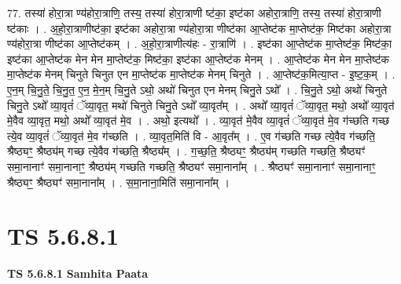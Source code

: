 \documentclass[17pt]{extarticle}
\begin{document}
77. तस्या॑ होरा॒त्रा ण्य॑होरा॒त्राणि॒ तस्य॒ तस्या॑ होरा॒त्राणी ष्ट॑का॒ इष्ट॑का अहोरा॒त्राणि॒ तस्य॒ तस्या॑ होरा॒त्राणी ष्ट॑काः । . अ॒हो॒रा॒त्राणीष्ट॑का॒ इष्ट॑का अहोरा॒त्रा ण्य॑होरा॒त्रा णीष्ट॑का आ॒प्तेष्ट॑क मा॒प्तेष्ट॑क॒ मिष्ट॑का अहोरा॒त्रा ण्य॑होरा॒त्रा णीष्ट॑का आ॒प्तेष्ट॑कम् । . अ॒हो॒रा॒त्राणीत्य॑हः - रा॒त्राणि॑ । . इष्ट॑का आ॒प्तेष्ट॑क मा॒प्तेष्ट॑क॒ मिष्ट॑का॒ इष्ट॑का आ॒प्तेष्ट॑क मेन मेन मा॒प्तेष्ट॑क॒ मिष्ट॑का॒ इष्ट॑का आ॒प्तेष्ट॑क मेनम् । . आ॒प्तेष्ट॑क मेन मेन मा॒प्तेष्ट॑क मा॒प्तेष्ट॑क मेनम् चिनुते चिनुत एन मा॒प्तेष्ट॑क मा॒प्तेष्ट॑क मेनम् चिनुते । . आ॒प्तेष्ट॑क॒मित्या॒प्त - इ॒ष्ट॒क॒म् । . ए॒न॒म् चि॒नु॒ते॒ चि॒नु॒त॒ ए॒न॒ मे॒न॒म् चि॒नु॒ते ऽथो॒ अथो॑ चिनुत एन मेनम् चिनु॒ते ऽथो᳚ । . चि॒नु॒ते ऽथो॒ अथो॑ चिनुते चिनु॒ते ऽथो᳚ व्या॒वृतं॑ ॅव्या॒वृत॒ मथो॑ चिनुते चिनु॒ते ऽथो᳚ व्या॒वृत᳚म् । . अथो᳚ व्या॒वृतं॑ ॅव्या॒वृत॒ मथो॒ अथो᳚ व्या॒वृत॑ मे॒वैव व्या॒वृत॒ मथो॒ अथो᳚ व्या॒वृत॑ मे॒व । . अथो॒ इत्यथो᳚ । . व्या॒वृत॑ मे॒वैव व्या॒वृतं॑ ॅव्या॒वृत॑ मे॒व ग॑च्छति गच्छ त्ये॒व व्या॒वृतं॑ ॅव्या॒वृत॑ मे॒व ग॑च्छति । . व्या॒वृत॒मिति॑ वि - आ॒वृत᳚म् । . ए॒व ग॑च्छति गच्छ त्ये॒वैव ग॑च्छति॒ श्रैष्ठ्यꣳ॒॒ श्रैष्ठ्य॑म् गच्छ त्ये॒वैव ग॑च्छति॒ श्रैष्ठ्य᳚म् । . ग॒च्छ॒ति॒ श्रैष्ठ्यꣳ॒॒ श्रैष्ठ्य॑म् गच्छति गच्छति॒ श्रैष्ठ्यꣳ॑ समा॒नानाꣳ॑ समा॒नानाꣳ॒॒ श्रैष्ठ्य॑म् गच्छति गच्छति॒ श्रैष्ठ्यꣳ॑ समा॒नाना᳚म् । . श्रैष्ठ्यꣳ॑ समा॒नानाꣳ॑ समा॒नानाꣳ॒॒ श्रैष्ठ्यꣳ॒॒ श्रैष्ठ्यꣳ॑ समा॒नाना᳚म् । . स॒मा॒नाना॒मिति॑ समा॒नाना᳚म् । \newline
\pagebreak
{}

\section{ TS 5.6.8.1 }

\textbf{TS 5.6.8.1 } \newline
\textbf{Samhita Paata} \newline
\end{document}
